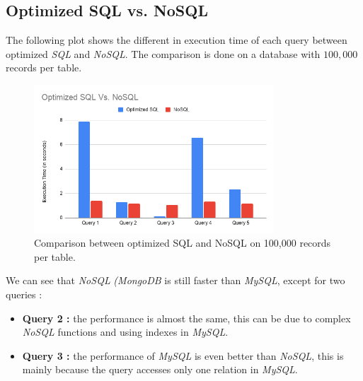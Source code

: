 \subsection{Optimized SQL vs. NoSQL}
The following plot shows the different in execution time of each query between optimized \emph{SQL} and \emph{NoSQL}. The comparison is done on a database with $100,000$ records per table.
\begin{figure}[H]
    \centering
    \includegraphics[width=0.8\textwidth]{images/stats/sql-vs-nosql.png}
    \caption{Comparison between optimized SQL and NoSQL on 100,000 records per table.}
    \label{fig:db-size-2}
\end{figure}

We can see that \emph{NoSQL} \emph{(MongoDB} is still faster than \emph{MySQL}, except for two queries :
\begin{itemize}
    \item \textbf{Query 2 :} the performance is almost the same, this can be due to complex \emph{NoSQL} functions and using indexes in \emph{MySQL}.
    \item \textbf{Query 3 :} the performance of \emph{MySQL} is even better than \emph{NoSQL}, this is mainly because the query accesses only one relation in \emph{MySQL}.
\end{itemize}

